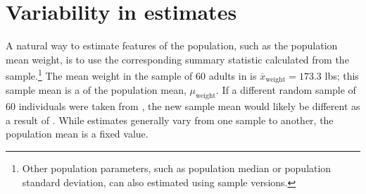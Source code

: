 \section[Variability in estimates]{Variability in estimates} %
\label{variabilityInEstimates}


A natural way to estimate features of the population, such as the population mean weight, is to use the corresponding summary statistic calculated from the sample.\footnote{Other population parameters, such as population median or population standard deviation, can also estimated using sample versions.} The mean weight in the sample of 60 adults in  is $\overline{x}_{\text{weight}} = 173.3$ lbs; this sample mean is a  of the population mean, $\mu_{\text{weight}}$. If a different random sample of 60 individuals were taken from , the new sample mean would likely be different as a result of . While estimates generally vary from one sample to another, the population mean is a fixed value.  

